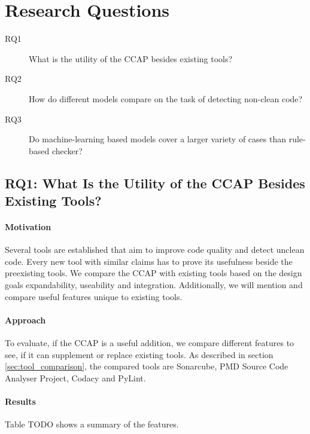 \section{Research Questions}

\begin{description}
    \item[RQ1] What is the utility of the CCAP besides existing tools? 
    \item[RQ2] How do different models compare on the task of detecting non-clean code?
    \item[RQ3] Do machine-learning based models cover a larger variety of cases than rule-based checker? 
\end{description}

\subsection{RQ1: What Is the Utility of the CCAP Besides Existing Tools?}
\paragraph{Motivation}
Several tools are established that aim to improve code quality and detect unclean code. Every new tool with similar claims has to prove its usefulness beside the preexisting tools. We compare the CCAP with existing tools based on the design goals expandability, useability and integration. Additionally, we will mention and compare useful features unique to existing tools.
\paragraph{Approach}
To evaluate, if the CCAP is a useful addition, we compare different features to see, if it can supplement or replace existing tools. As described in section \ref{sec:tool_comparison}, the compared tools are Sonarcube, PMD Source Code Analyser Project, Codacy and PyLint.

\paragraph{Results}
Table TODO shows a summary of the features.

